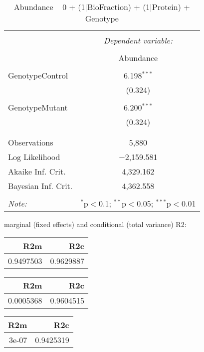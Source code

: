 \documentclass[11pt]{report}
\begin{document}
\begin{table}[!htbp] \centering 
  \caption{Abundance ~ 0 + (1|BioFraction) + (1|Protein) + Genotype} 
  \label{} 
\begin{tabular}{@{\extracolsep{5pt}}lc} 
\\[-1.8ex]\hline 
\hline \\[-1.8ex] 
 & \multicolumn{1}{c}{\textit{Dependent variable:}} \\ 
\cline{2-2} 
\\[-1.8ex] & Abundance \\ 
\hline \\[-1.8ex] 
 GenotypeControl & 6.198$^{***}$ \\ 
  & (0.324) \\ 
  & \\ 
 GenotypeMutant & 6.200$^{***}$ \\ 
  & (0.324) \\ 
  & \\ 
\hline \\[-1.8ex] 
Observations & 5,880 \\ 
Log Likelihood & $-$2,159.581 \\ 
Akaike Inf. Crit. & 4,329.162 \\ 
Bayesian Inf. Crit. & 4,362.558 \\ 
\hline 
\hline \\[-1.8ex] 
\textit{Note:}  & \multicolumn{1}{r}{$^{*}$p$<$0.1; $^{**}$p$<$0.05; $^{***}$p$<$0.01} \\ 
\end{tabular} 
\end{table} 
marginal (fixed effects) and conditional (total variance) R2:

\begin{tabular}{r|r}
\hline
R2m & R2c\\
\hline
0.9497503 & 0.9629887\\
\hline
\end{tabular}

\begin{tabular}{r|r}
\hline
R2m & R2c\\
\hline
0.0005368 & 0.9604515\\
\hline
\end{tabular}

\begin{tabular}{r|r}
\hline
R2m & R2c\\
\hline
3e-07 & 0.9425319\\
\hline
\end{tabular}
\end{document}
